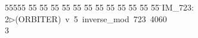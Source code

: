 %
%
\begin{tabbing}
55555 \= 55 \= 55 \= 55 \= 55 \= 55 \= 55 \= 55 \= 55 \= 55 \= 55 \= 55 \= 55 \= \>IM\_723:\\[0pt]
2\>$\triangleright$\>(ORBITER)\ v\ 5\ inverse\_mod\ 723\ 4060\\[0pt]
3\>\end{tabbing}
